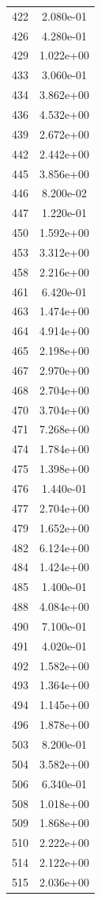 \documentclass[12pt]{article}
\begin{document}
\begin{longtable}{@{}cc@{}}
422 & 2.080e-01 \\
426 & 4.280e-01 \\
429 & 1.022e+00 \\
433 & 3.060e-01 \\
434 & 3.862e+00 \\
436 & 4.532e+00 \\
439 & 2.672e+00 \\
442 & 2.442e+00 \\
445 & 3.856e+00 \\
446 & 8.200e-02 \\
447 & 1.220e-01 \\
450 & 1.592e+00 \\
453 & 3.312e+00 \\
458 & 2.216e+00 \\
461 & 6.420e-01 \\
463 & 1.474e+00 \\
464 & 4.914e+00 \\
465 & 2.198e+00 \\
467 & 2.970e+00 \\
468 & 2.704e+00 \\
470 & 3.704e+00 \\
471 & 7.268e+00 \\
474 & 1.784e+00 \\
475 & 1.398e+00 \\
476 & 1.440e-01 \\
477 & 2.704e+00 \\
479 & 1.652e+00 \\
482 & 6.124e+00 \\
484 & 1.424e+00 \\
485 & 1.400e-01 \\
488 & 4.084e+00 \\
490 & 7.100e-01 \\
491 & 4.020e-01 \\
492 & 1.582e+00 \\
493 & 1.364e+00 \\
494 & 1.145e+00 \\
496 & 1.878e+00 \\
503 & 8.200e-01 \\
504 & 3.582e+00 \\
506 & 6.340e-01 \\
508 & 1.018e+00 \\
509 & 1.868e+00 \\
510 & 2.222e+00 \\
514 & 2.122e+00 \\
515 & 2.036e+00 \\

\end{longtable}
\end{document}
